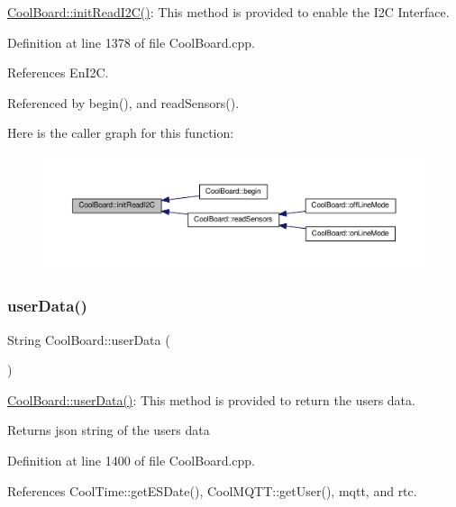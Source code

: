 \hyperlink{class_cool_board_a397b46fadab8f530a8cf4d914c561366}{Cool\+Board\+::init\+Read\+I2\+C()}\+: This method is provided to enable the I2C Interface. 

Definition at line 1378 of file Cool\+Board.\+cpp.



References En\+I2C.



Referenced by begin(), and read\+Sensors().

Here is the caller graph for this function\+:\nopagebreak
\begin{figure}[H]
\begin{center}
\leavevmode
\includegraphics[width=350pt]{d7/df9/class_cool_board_a397b46fadab8f530a8cf4d914c561366_icgraph}
\end{center}
\end{figure}
\mbox{\label{class_cool_board_ae7358fb6e623cfc81b775f5f1734909b}} 
\subsubsection{\texorpdfstring{user\+Data()}{userData()}}
{\footnotesize\ttfamily String Cool\+Board\+::user\+Data (\begin{DoxyParamCaption}{ }\end{DoxyParamCaption})}

\hyperlink{class_cool_board_ae7358fb6e623cfc81b775f5f1734909b}{Cool\+Board\+::user\+Data()}\+: This method is provided to return the user\textquotesingle{}s data.

\begin{DoxyReturn}{Returns}
json string of the user\textquotesingle{}s data 
\end{DoxyReturn}


Definition at line 1400 of file Cool\+Board.\+cpp.



References Cool\+Time\+::get\+E\+S\+Date(), Cool\+M\+Q\+T\+T\+::get\+User(), mqtt, and rtc.



